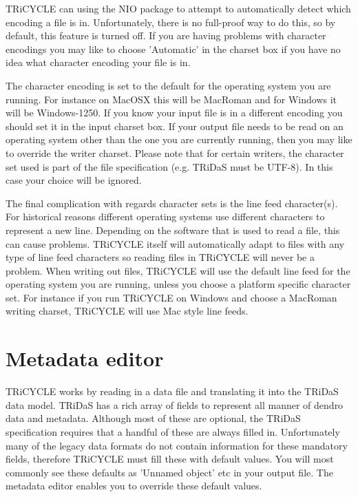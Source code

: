 \documentclass[10pt, headsepline,DIV14,BCOR0.5cm]{scrreprt}
\begin{document}
TRiCYCLE can using the NIO package to attempt to automatically detect which encoding a file is in.
Unfortunately, there is no full-proof way to do this, so by default, this feature is turned off. If you are
having problems with character encodings you may like to choose 'Automatic' in the charset box if you
have no idea what character encoding your file is in.

The character encoding is set to the default for the operating system you are running. For instance on
MacOSX this will be MacRoman and for Windows it will be Windows-1250. If you know your input file
is in a different encoding you should set it in the input charset box. If your output file needs to be read
on an operating system other than the one you are currently running, then you may like to override the
writer charset. Please note that for certain writers, the character set used is part of the file specification
(e.g. TRiDaS must be UTF-8). In this case your choice will be ignored.

The final complication with regards character sets is the line feed character(s). For historical reasons
different operating systems use different characters to represent a new line. Depending on the software
that is used to read a file, this can cause problems. TRiCYCLE itself will automatically adapt to files with
any type of line feed characters so reading files in TRiCYCLE will never be a problem. When writing
out files, TRiCYCLE will use the default line feed for the operating system you are running, unless you
choose a platform specific character set. For instance if you run TRiCYCLE on Windows and choose a
MacRoman writing charset, TRiCYCLE will use Mac style line feeds.


\section{Metadata editor}

TRiCYCLE works by reading in a data file and translating it into the TRiDaS data model. TRiDaS has
a rich array of fields to represent all manner of dendro data and metadata. Although most of these are
optional, the TRiDaS specification requires that a handful of these are always filled in. Unfortunately many
of the legacy data formats do not contain information for these mandatory fields, therefore TRiCYCLE
must fill these with default values. You will most commonly see these defaults as 'Unnamed object' etc in
your output file. The metadata editor enables you to override these default values.
\end{document}
